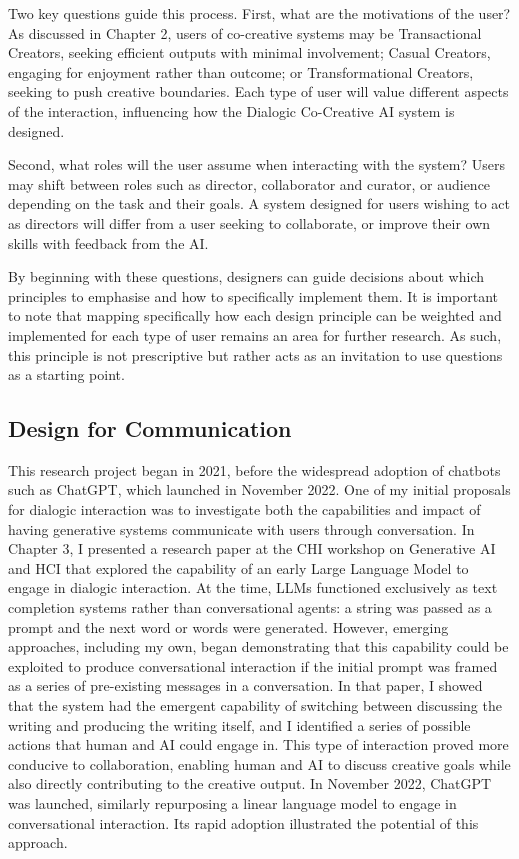 Two key questions guide this process. First, what are the motivations of the user? As discussed in Chapter 2, users of co-creative systems may be Transactional Creators, seeking efficient outputs with minimal involvement; Casual Creators, engaging for enjoyment rather than outcome; or Transformational Creators, seeking to push creative boundaries. Each type of user will value different aspects of the interaction, influencing how the Dialogic Co-Creative AI system is designed. 

Second, what roles will the user assume when interacting with the system? Users may shift between roles such as director, collaborator and curator, or audience depending on the task and their goals. A system designed for users wishing to act as directors will differ from a user seeking to collaborate, or improve their own skills with feedback from the AI. 

By beginning with these questions, designers can guide decisions about which principles to emphasise and how to specifically implement them. It is important to note that mapping specifically how each design principle can be weighted and implemented for each type of user remains an area for further research. As such, this principle is not prescriptive but rather acts as an invitation to use questions as a starting point. 


\subsection{Design for Communication}

This research project began in 2021, before the widespread adoption of chatbots such as ChatGPT, which launched in November 2022. One of my initial proposals for dialogic interaction was to investigate both the capabilities and impact of having generative systems communicate with users through conversation. In Chapter 3, I presented a research paper at the CHI workshop on Generative AI and HCI that explored the capability of an early Large Language Model to engage in dialogic interaction. At the time, LLMs functioned exclusively as text completion systems rather than conversational agents: a string was passed as a prompt and the next word or words were generated. However, emerging approaches, including my own, began demonstrating that this capability could be exploited to produce conversational interaction if the initial prompt was framed as a series of pre-existing messages in a conversation. In that paper, I showed that the system had the emergent capability of switching between discussing the writing and producing the writing itself, and I identified a series of possible actions that human and AI could engage in. This type of interaction proved more conducive to collaboration, enabling human and AI to discuss creative goals while also directly contributing to the creative output. In November 2022, ChatGPT was launched, similarly repurposing a linear language model to engage in conversational interaction. Its rapid adoption illustrated the potential of this approach.

